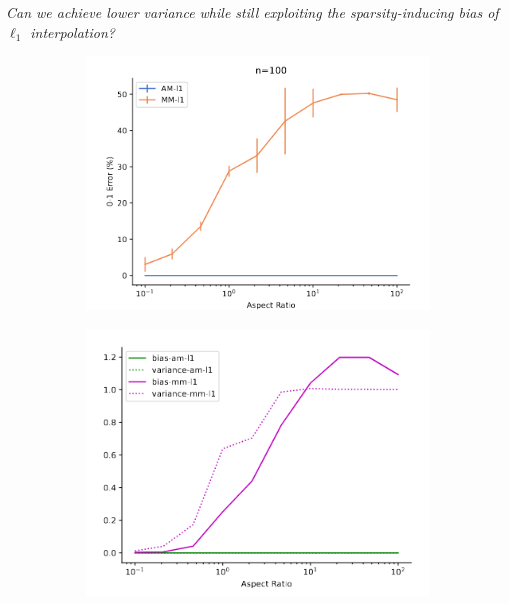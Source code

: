 \begin{center}

\emph{Can we achieve lower variance while still exploiting the sparsity-inducing
bias of $\ell_1$ interpolation?}

\end{center}

\begin{figure}[t]
  \centering
  \begin{subfigure}[t]{0.24\linewidth}
    \centering
    \includegraphics[width=\columnwidth]{figures/estim_err_s1.png}
    \label{fig:estim_err_s1}
    \caption{}
  \end{subfigure}
  \hfill
  \begin{subfigure}[t]{0.24\linewidth}
    \centering
    \includegraphics[width=\columnwidth]{figures/bias_variance_s1.png}

\end{subfigure}
\end{figure}
